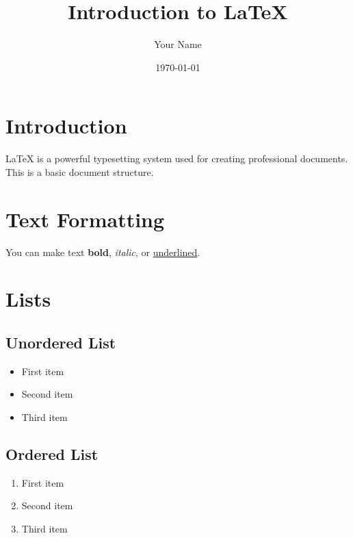 \documentclass{article}
\begin{document}
\title{Introduction to LaTeX}
\author{Your Name}
\date{\today}

\maketitle

\section{Introduction}
LaTeX is a powerful typesetting system used for creating professional documents. This is a basic document structure.

\section{Text Formatting}
You can make text \textbf{bold}, \textit{italic}, or \underline{underlined}.

\section{Lists}
\subsection{Unordered List}
\begin{itemize}
    \item First item
    \item Second item
    \item Third item
\end{itemize}

\subsection{Ordered List}
\begin{enumerate}
    \item First item
    \item Second item
    \item Third item
\end{enumerate}
\end{document}
